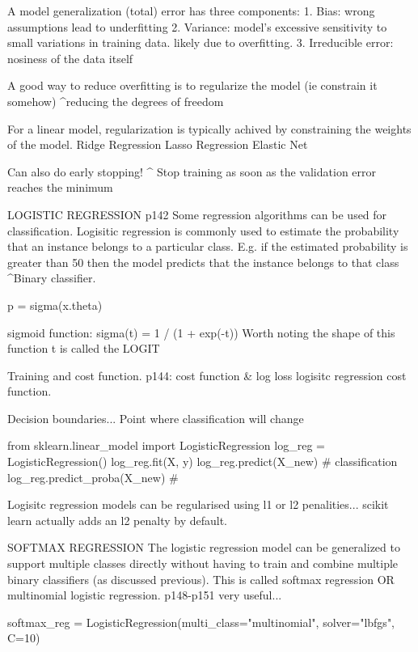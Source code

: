 A model generalization (total) error has three components:
1. Bias: wrong assumptions lead to underfitting
2. Variance: model's excessive sensitivity to small variations in training data. likely due to overfitting.
3. Irreducible error: nosiness of the data itself


A good way to reduce overfitting is to regularize the model (ie constrain it somehow)
^reducing the degrees of freedom

For a linear model, regularization is typically achived by constraining the weights of the model.
Ridge Regression
Lasso Regression
Elastic Net

Can also do early stopping!
^ Stop training as soon as the validation error reaches the minimum

LOGISTIC REGRESSION p142
Some regression algorithms can be used for classification.
Logisitic regression is commonly used to estimate the probability that
an instance belongs to a particular class.
E.g. if the estimated probability is greater than 50%
then the model predicts that the instance belongs to that class
^Binary classifier.

p = sigma(x.theta)

sigmoid function:
sigma(t) = 1 / (1 + exp(-t))
Worth noting the shape of this function
t is called the LOGIT

Training and cost function.
p144: cost function & log loss logisitc regression cost function.

Decision boundaries...
Point where classification will change

from sklearn.linear_model import LogisticRegression
log_reg = LogisticRegression()
log_reg.fit(X, y)
log_reg.predict(X_new) # classification
log_reg.predict_proba(X_new) # 

Logisitc regression models can be regularised using l1 or l2 penalities...
scikit learn actually adds an l2 penalty by default.

SOFTMAX REGRESSION
The logistic regression model can be generalized to support multiple classes directly
without having to train and combine multiple binary classifiers (as discussed previous).
This is called softmax regression OR multinomial logistic regression.
p148-p151 very useful...

softmax_reg = LogisticRegression(multi_class="multinomial", solver="lbfgs", C=10)

























